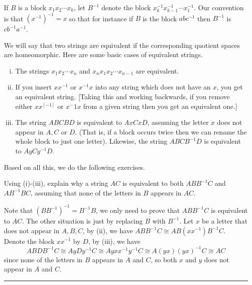 \documentclass[a4paper, 12pt]{article}
\begin{document}
\begin{background}
If \(B\) is a block \(x_1x_2\cdots x_k\), let \(B^{-1}\) denote the block \(x_k^{-1}x_{k-1}^{-1}\cdots x_1^{-1}\). Our convention is that \((x^{-1})^{-1}=x\) so that for instance if \(B\) is the block \(abc^{-1}\) then 
\(B^{-1}\) is \(cb^{-1}a^{-1}\).

We will say that two strings are equivalent if the corresponding quotient spaces are homeomorphic. Here are some basic cases of equivalent strings. 
\begin{enumerate}[(i)]
\item The strings \(x_1x_2\cdots x_n\) and \(x_nx_1x_2 \cdots x_{n-1}\) are equivalent. 
\item If you insert \(xx^{-1}\) or \(x^{-1}x\) into any string which does not have an \(x\), you get an equivalent string. [Taking this and working backwards, if you remove either \(xx^[-1]\) or \(x^-1x\) from a given string then you get an 
equivalent one.]
\item The string \(ABCBD\) is equivalent to \(AxCxD\), assuming the letter \(x\) does not appear in \(A,C\) or \(D\). (That is, if a block occurs twice then we can rename the whole block to just one letter). Likewise, the string \(ABCB^{-1}D\) is equivalent to \(AyCy^{-1}D\).
\end{enumerate}
Based on all this, we do the following exercises.
\end{background}

\begin{problem}{3}
Using (i)-(iii), explain why a string \(AC\) is equivalent to both \(ABB^{-1}C\) and \(AB^{-1}BC\), assuming that none of the letters in \(B\) appears in \(AC\).
\end{problem}
\begin{solution}
Note that \((BB^{-1})^{-1}=B^{-1}B\), we only need to prove that \(ABB^{-1}C\) is equivalent to \(AC\). The other situation is just by replacing \(B\) with \(B^{-1}\). Let \(x\) be a letter that does not appear in \(A,B,C\), by (ii), we have 
\(ABB^{-1}C\cong AB(xx^{-1})B^{-1}C\). Denote the block \(xx^{-1}\) by \(D\), by (iii), we have 
\[ABDB^{-1}C\cong AyDy^{-1}C\cong Ayxx^{-1}y^{-1}C\cong A(yx)(yx)^{-1}C\cong AC\]
since none of the letters in \(B\) appears in \(A\) and \(C\), so both \(x\) and \(y\) does not appear in \(A\) and \(C\).
\end{solution}

\noindent\rule{7in}{2.8pt}
\end{document}

